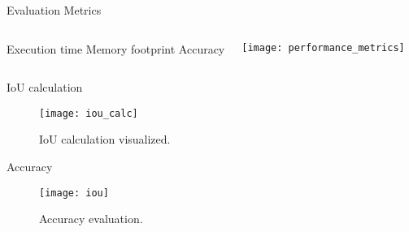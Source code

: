 \begin{frame}[t]{Evaluation Metrics} %
    \begin{columns}[c]
            \newline
            \newline
                Execution time
            \newline
            \newline
                Memory footprint
            \newline
            \newline
                Accuracy
           
        \begin{flushright}
            \texttt{[image: performance\_metrics]}
        \end{flushright} 
    \end{columns}
\end{frame}


\begin{frame}[t]{IoU calculation} 
    \begin{figure}
        \centering
        
       \texttt{[image: iou\_calc]}
       \caption{IoU calculation visualized. \cite{ioucalc}}
    \end{figure}
\end{frame}


\begin{frame}[t]{Accuracy} %
    \begin{figure}
        \centering
        
       \texttt{[image: iou]}
       \caption{Accuracy evaluation. \cite{IoU}}
    \end{figure}
\end{frame}
